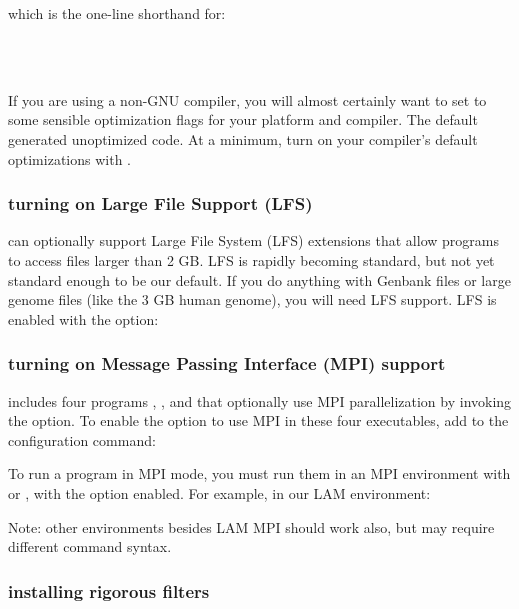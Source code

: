 which is the one-line shorthand for:

\\
\\

If you are using a non-GNU compiler, you will almost certainly want to
set  to some sensible optimization flags for your
platform and compiler. The  default generated unoptimized
code. At a minimum, turn on your compiler's default optimizations with
.

\subsubsection{turning on Large File Support (LFS)}

 can optionally support Large File System (LFS)
extensions that allow programs to access files larger than 2 GB. LFS
is rapidly becoming standard, but not yet standard enough to be our
default. If you do anything with Genbank files or large genome files
(like the 3 GB human genome), you will need LFS support.  LFS is
enabled with the  option:


\subsubsection{turning on Message Passing Interface (MPI) support}

 includes four programs , ,
 and  that optionally use MPI
parallelization by invoking the  option. 
To enable the option to use MPI in these four executables, add 
 to the configuration command:


To run a program in MPI mode, you must run them 
in an MPI environment with  or , with 
the  option enabled.  For example, 
in our LAM environment:


Note: other environments besides LAM MPI should work also, but may
require different command syntax.

\subsubsection{installing rigorous filters}

